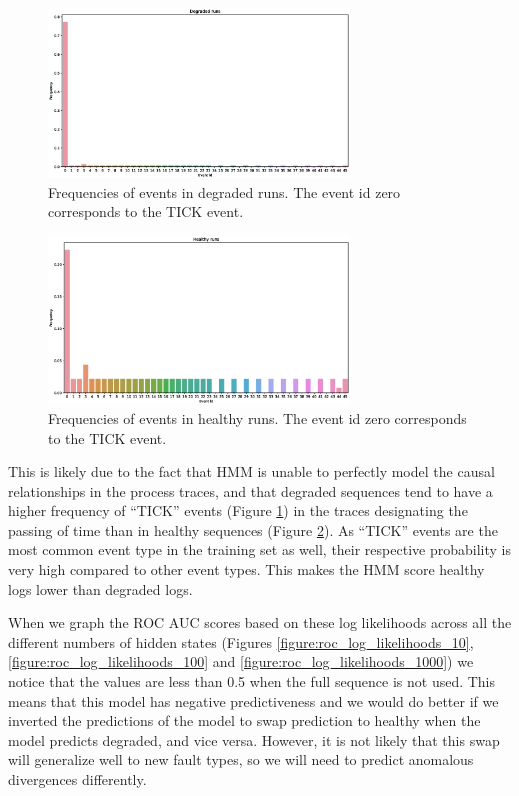 \documentclass[journal]{IEEEtran}
\begin{document}
\begin{figure}[h]
 \centering
 \includegraphics[width=8cm,keepaspectratio=true]{./degraded_runs_data_histogram.eps}
 \caption{Frequencies of events in degraded runs. The event id zero corresponds to the TICK event.}
 \label{figure:degraded_histogram}
\end{figure}

\begin{figure}[h]
 \centering
 \includegraphics[width=8cm,keepaspectratio=true]{./healthy_runs_data_histogram.eps}
 \caption{Frequencies of events in healthy runs. The event id zero corresponds to the TICK event.}
 \label{figure:healthy_histogram}
\end{figure}

This is likely due to the fact that HMM is unable to perfectly model the causal relationships in the process traces, and that degraded sequences tend to have a higher frequency of ``TICK'' events (Figure \ref{figure:degraded_histogram}) in the traces designating the passing of time than in healthy sequences (Figure \ref{figure:healthy_histogram}). As ``TICK'' events are the most common event type in the training set as well, their respective probability is very high compared to other event types. This makes the HMM score healthy logs  lower than degraded logs.

When we graph the ROC AUC scores based on these log likelihoods across all the different numbers of hidden states (Figures \ref{figure:roc_log_likelihoods_10}, \ref{figure:roc_log_likelihoods_100} and \ref{figure:roc_log_likelihoods_1000}) we notice that the values are less than 0.5 when the full sequence is not used. This means that this model has negative predictiveness and we would do better if we inverted the predictions of the model to swap prediction to healthy when the model predicts degraded, and vice versa. However, it is not likely that this swap will generalize well to new fault types, so we will need to predict anomalous divergences differently.
\end{document}

